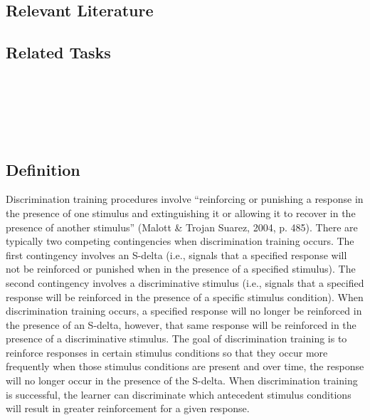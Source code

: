 \subsection{Relevant Literature}
\begin{refsection}
\nocite{test,alang2017police,clayton2018black}
\printbibliography[heading=none]
\end{refsection}
%
\subsection{Related Tasks} 
\foureNine{}\\
\fourFKTwentySix{}\\
\fourFKTwentySeven{}\\
\fourFKTwentyNine{}\\





\section{\foureTwo{}}
\subsection{Definition}
Discrimination training procedures involve ``reinforcing or punishing a response in the presence of one stimulus and extinguishing it or allowing it to recover in the presence of another stimulus'' (Malott \& Trojan Suarez, 2004, p. 485). There are typically two competing contingencies when discrimination training occurs.  The first contingency involves an S-delta (i.e., signals that a specified response will not be reinforced or punished when in the presence of a specified stimulus). The second contingency involves a discriminative stimulus (i.e., signals that a specified response will be reinforced in the presence of a specific stimulus condition). When discrimination training occurs, a specified response will no longer be reinforced in the presence of an S-delta, however, that same response will be reinforced in the presence of a discriminative stimulus. The goal of discrimination training is to reinforce responses in certain stimulus conditions so that they occur more frequently when those stimulus conditions are present and over time, the response will no longer occur in the presence of the S-delta. When discrimination training is successful, the learner can discriminate which antecedent stimulus conditions will result in greater reinforcement for a given response. 
%
